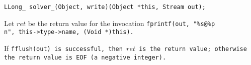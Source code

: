 
\tt{LLong_ solver_(Object, write)(Object *this, Stream out);}


Let $ret$ be the return value for the invocation
\tt{fprintf(out, "\%s@\%p\\n", this->type->name, (Void *)this)}.

If \tt{fflush(out)} is successful, then $ret$ is the return value;
otherwise the return value is \tt{EOF} (a negative integer).
